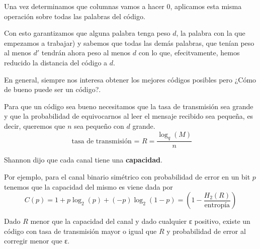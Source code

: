 Una vez determinamos que columnas vamos a hacer 0, aplicamos esta misma operación sobre todas las palabras del código.

Con esto garantizamos que alguna palabra tenga peso $d$, la palabra con la que empezamos a trabajar) y sabemos que todas las demás palabras, que tenían peso al menos $d'$ tendrán ahora peso al menos $d$ con lo que, efecitvamente, hemos reducido la distancia del código a $d$.


En general, siempre nos interesa obtener los mejores códigos posibles pero ¿Cómo de bueno puede ser un código?.

Para que un código sea bueno necesitamos que la tasa de transmisión sea grande y que la probabilidad de equivocarnos al leer el mensaje recibido sea pequeña, es decir, queremos que $n$ sea pequeño con $d$ grande.
\[\text{ tasa de transmisión = } R = \frac{\log_q(M)}{n}\]

Shannon dijo que cada canal tiene una \textbf{capacidad}.

Por ejemplo, para el canal binario simétrico con probabilidad de error en un bit $p$ tenemos que la capacidad del mismo es viene dada por
\[C(p)=1+p\log_2(p)+(-p)\log_2(1-p)=\left(1-\frac{H_2(R)}{\text{entropía}}\right)\]

\begin{theorem}
Dado $R$ menor que la capacidad del canal y dado cualquier ε positivo, existe un código con tasa de transmisión mayor o igual que $R$ y probabilidad de error al corregir menor que ε.
\end{theorem}